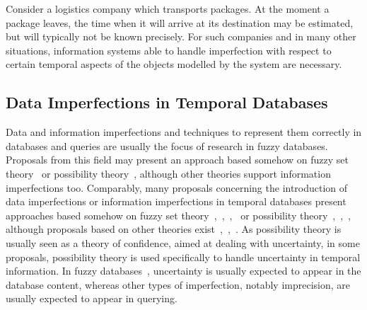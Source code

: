 %
%
Consider a logistics company which transports packages. At the moment a package leaves, the time when it will arrive at its destination may be estimated, but will typically not be known precisely. For such companies and in many other situations, information systems able to handle imperfection with respect to certain temporal aspects of the objects modelled by the system are necessary.

\subsection{Data Imperfections in Temporal Databases}


Data and information imperfections and techniques to represent them correctly in databases and queries are usually the focus of research in fuzzy databases. Proposals from this field may present an approach based somehow on fuzzy set theory~\cite{Zadeh65} or possibility theory~\cite{Dubois:Prade:1988:PossibilityTheory}, although other theories support information imperfections too. Comparably, many proposals concerning the introduction of data imperfections or information imperfections in temporal databases present approaches based somehow on fuzzy set theory~\cite{garrido2009},~\cite{gal01},~\cite{nagypal2003},~\cite{Billiet:Pons:Matthe:DeTre:Pons:2011:BipolarFuzzy} or possibility theory~\cite{Dubois89},~\cite{Pon11},~\cite{129895}, although proposals based on other theories exist~\cite{Dyreson1998},~\cite{Dekhtyar2001},~\cite{Qia09}. As possibility theory is usually seen as a theory of confidence, aimed at dealing with uncertainty, in some proposals, possibility theory is used specifically to handle uncertainty in temporal information. In fuzzy databases~\cite{Galindo2006}, uncertainty is usually expected to appear in the database content, whereas other types of imperfection, notably imprecision, are usually expected to appear in querying. 

